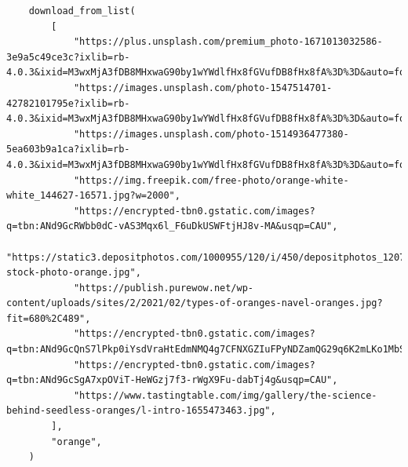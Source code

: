\begin{verbatim}
    download_from_list(
        [
            "https://plus.unsplash.com/premium_photo-1671013032586-3e9a5c49ce3c?ixlib=rb-4.0.3&ixid=M3wxMjA3fDB8MHxwaG90by1wYWdlfHx8fGVufDB8fHx8fA%3D%3D&auto=format&fit=crop&w=2787&q=80",
            "https://images.unsplash.com/photo-1547514701-42782101795e?ixlib=rb-4.0.3&ixid=M3wxMjA3fDB8MHxwaG90by1wYWdlfHx8fGVufDB8fHx8fA%3D%3D&auto=format&fit=crop&w=2787&q=80",
            "https://images.unsplash.com/photo-1514936477380-5ea603b9a1ca?ixlib=rb-4.0.3&ixid=M3wxMjA3fDB8MHxwaG90by1wYWdlfHx8fGVufDB8fHx8fA%3D%3D&auto=format&fit=crop&w=2835&q=80",
            "https://img.freepik.com/free-photo/orange-white-white_144627-16571.jpg?w=2000",
            "https://encrypted-tbn0.gstatic.com/images?q=tbn:ANd9GcRWbb0dC-vAS3Mqx6l_F6uDkUSWFtjHJ8v-MA&usqp=CAU",
            "https://static3.depositphotos.com/1000955/120/i/450/depositphotos_1207359-stock-photo-orange.jpg",
            "https://publish.purewow.net/wp-content/uploads/sites/2/2021/02/types-of-oranges-navel-oranges.jpg?fit=680%2C489",
            "https://encrypted-tbn0.gstatic.com/images?q=tbn:ANd9GcQnS7lPkp0iYsdVraHtEdmNMQ4g7CFNXGZIuFPyNDZamQG29q6K2mLKo1MbSeYfn8NdWoM&usqp=CAU",
            "https://encrypted-tbn0.gstatic.com/images?q=tbn:ANd9GcSgA7xpOViT-HeWGzj7f3-rWgX9Fu-dabTj4g&usqp=CAU",
            "https://www.tastingtable.com/img/gallery/the-science-behind-seedless-oranges/l-intro-1655473463.jpg",
        ],
        "orange",
    )
\end{verbatim}

